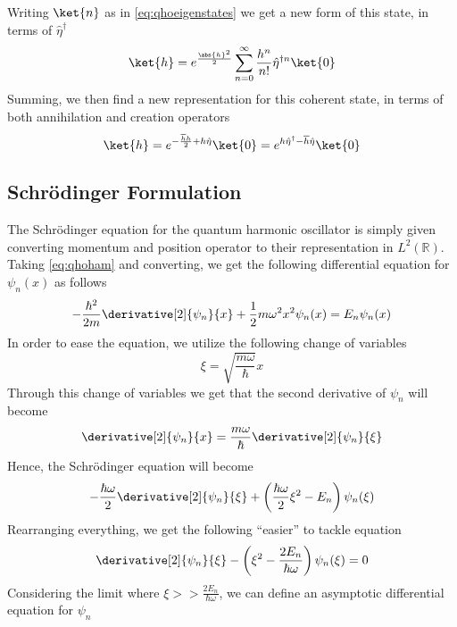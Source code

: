 \documentclass[a4paper, 11pt]{book}
\newcommand{\1}{\opr{\mathds{1}}}
\newcommand{\opr}[1]{\hat{#1}}
\newcommand{\adj}[2][]{#2^{\dagger#1}}
\theoremstyle{plain}
\begin{document}
	Writing $\ket{n}$ as in \eqref{eq:qhoeigenstates} we get a new form of this state, in terms of $\adj{\opr{\eta}}$
	\begin{equation}
		\ket{h}=e^{\frac{\abs{h}^2}{2}}\sum_{n=0}^{\infty}\frac{h^n}{n!}\adj[n]{\opr{\eta}}\ket{0}
		\label{eq:adjeta}
	\end{equation}
	Summing, we then find a new representation for this coherent state, in terms of both annihilation and creation operators
	\begin{equation}
		\ket{h}=e^{-\frac{\overline{h}h}{2}+h\opr{\eta}}\ket{0}=e^{h\adj{\opr{\eta}}-\overline{h}\opr{\eta}}\ket{0}
		\label{eq:etadagetarepr}
	\end{equation}
	\subsection{Schrödinger Formulation}
	The Schrödinger equation for the quantum harmonic oscillator is simply given converting momentum and position operator to their representation in $L^2(\mathbb{R})$. Taking \eqref{eq:qhoham} and converting, we get the following differential equation for $\psi_n(x)$ as follows
	\begin{equation}
		-\frac{\hbar^2}{2m}\derivative[2]{\psi_n}{x}+\frac{1}{2}m\omega^2x^2\psi_n(x)=E_n\psi_n(x)
		\label{eq:qhoschreq}
	\end{equation}
	In order to ease the equation, we utilize the following change of variables
	\begin{equation*}
		\xi=\sqrt{\frac{m\omega}{\hbar}}x
	\end{equation*}
	Through this change of variables we get that the second derivative of $\psi_n$ will become
	\begin{equation*}
		\derivative[2]{\psi_n}{x}=\frac{m\omega}{\hbar}\derivative[2]{\psi_n}{\xi}
	\end{equation*}
	Hence, the Schrödinger equation will become
	\begin{equation*}
		-\frac{\hbar\omega}{2}\derivative[2]{\psi_n}{\xi}+\left( \frac{\hbar\omega}{2}\xi^2-E_n \right)\psi_n(\xi)
	\end{equation*}
	Rearranging everything, we get the following ``easier'' to tackle equation
	\begin{equation}
		\derivative[2]{\psi_n}{\xi}-\left( \xi^2-\frac{2E_n}{\hbar\omega} \right)\psi_n(\xi)=0
		\label{eq:finalschrqho}
	\end{equation}
	Considering the limit where $\xi>>\frac{2E_n}{\hbar\omega}$, we can define an asymptotic differential equation for $\psi_n$
\end{document}
